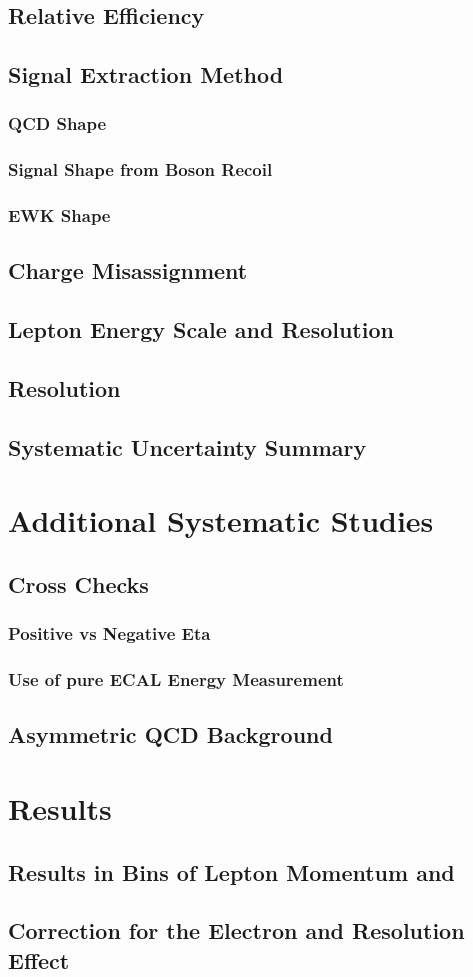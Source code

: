 \subsection{Relative Efficiency}
\subsection{Signal Extraction Method}
\subsubsection{QCD \ETm Shape}
\subsubsection{Signal \ETm Shape from Boson Recoil}
\subsubsection{EWK \ETm Shape}
\subsection{Charge Misassignment}
\subsection{Lepton Energy Scale and Resolution}
\subsection{\ETm Resolution}
\subsection{Systematic Uncertainty Summary}

\section{Additional Systematic Studies}
\subsection{Cross Checks}
\subsubsection{Positive vs Negative Eta}
\subsubsection{Use of pure ECAL Energy Measurement}
\subsection{Asymmetric QCD Background}

\section{Results}
\subsection{Results in Bins of Lepton Momentum and \ETm}
\subsection{Correction for the Electron and \ETm Resolution Effect}


